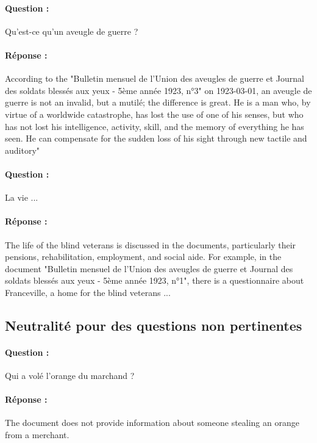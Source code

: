 \separation

\paragraph{Question :} Qu'est-ce qu'un aveugle de guerre ?

\paragraph{Réponse :}
According to the "Bulletin mensuel de l'Union des aveugles de guerre et Journal des soldats blessés aux yeux - 5ème année 1923, n°3" on 1923-03-01, an aveugle de guerre is not an invalid, but a mutilé; the difference is great. He is a man who, by virtue of a worldwide catastrophe, has lost the use of one of his senses, but who has not lost his intelligence, activity, skill, and the memory of everything he has seen. He can compensate for the sudden loss of his sight through new tactile and auditory"

\separation

\paragraph{Question :} La vie ...

\paragraph{Réponse :}
The life of the blind veterans is discussed in the documents, particularly their pensions, rehabilitation, employment, and social aide. For example, in the document "Bulletin mensuel de l'Union des aveugles de guerre et Journal des soldats blessés aux yeux - 5ème année 1923, n°1", there is a questionnaire about Franceville, a home for the blind veterans ...

\subsection{Neutralité pour des questions non pertinentes} \label{appdx:requetesnonpertinentes}
\paragraph{Question :} Qui a volé l'orange du marchand ?

\paragraph{Réponse :} The document does not provide information about someone stealing an orange from a merchant.

